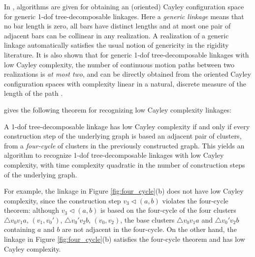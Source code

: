 \documentclass[prodmode,acmtoms]{acmsmall}
\begin{document}
In , %
algorithms are given for obtaining an (oriented) Cayley configuration space 
for generic 1-dof tree-decomposable linkages. 
Here a \emph{generic linkage} means that no bar length is zero, all bars have distinct lengths and 
at most one pair of adjacent bars can be collinear in any realization. 
A realization of a generic linkage automatically satisfies the usual notion of genericity in the rigidity literature.
It is also shown that for generic 1-dof tree-decomposable linkages with low Cayley complexity, 
the number of continuous motion paths between two realizations is \emph{at most two}, 
and can be directly obtained from the oriented Cayley configuration spaces with complexity linear
in a natural, discrete measure of the length of the path \cite[Theorem 3]{Sitharam2011a}.

 gives the following theorem for recognizing low Cayley complexity linkages:
\begin{theorem}\label{the:four-cycle}
 A 1-dof tree-decomposable linkage has low Cayley complexity
if and only if every construction step of the underlying graph 
is based an adjacent pair of clusters, 
from a \emph{four-cycle} of clusters in the previously constructed graph. 
This yields an algorithm to recognize 1-dof tree-decomposable linkages with low Cayley complexity,
with time complexity quadratic in the number of construction steps of the underlying graph.
\end{theorem}
%
For example, the linkage in Figure \ref{fig:four_cycle}(b) does not have low Cayley complexity, 
since the construction step $v_3 \triangleleft (a,b)$ violates the four-cycle theorem: 
although  $v_3 \triangleleft (a,b)$ is based on the four-cycle of the four clusters $\triangle v_0v_1a$, $(v_1,v_0')$, $\triangle v_0'v_2b$, $(v_0,v_2)$, 
the  base clusters $\triangle v_0v_1a$ and $\triangle v_0'v_2b$ containing $a$ and $b$ are not adjacent in the four-cycle. On the other hand, the linkage in Figure \ref{fig:four_cycle}(b) satisfies the four-cycle theorem and  has low Cayley complexity.
\end{document}
